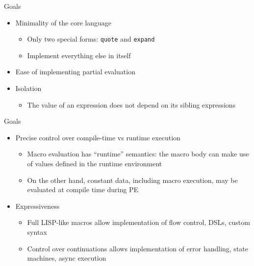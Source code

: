 \begin{frame}[fragile]{Goals}
\begin{itemize}
    \item Minimality of the core language
        \begin{itemize}
            \item Only two special forms: \verb|quote| and \verb|expand|
            \item Implement everything else in \lang itself
        \end{itemize}
    \item Ease of implementing partial evaluation
    \item Isolation
        \begin{itemize}
            \item The value of an expression does not depend on its sibling expressions
        \end{itemize}
\end{itemize}
\end{frame}
\begin{frame}[fragile]{Goals}
\begin{itemize}
    \item Precise control over compile-time vs runtime execution
        \begin{itemize}
            \item Macro evaluation has ``runtime'' semantics: the macro body can make use of values defined in the runtime environment
            \item On the other hand, constant data, including macro execution, may be evaluated at compile time during PE
        \end{itemize}
    \item Expressiveness
        \begin{itemize}
            \item Full LISP-like macros allow implementation of flow control, DSLs, custom syntax
            \item Control over continuations allows implementation of error handling, state machines, async execution
        \end{itemize}
\end{itemize}
\end{frame}


